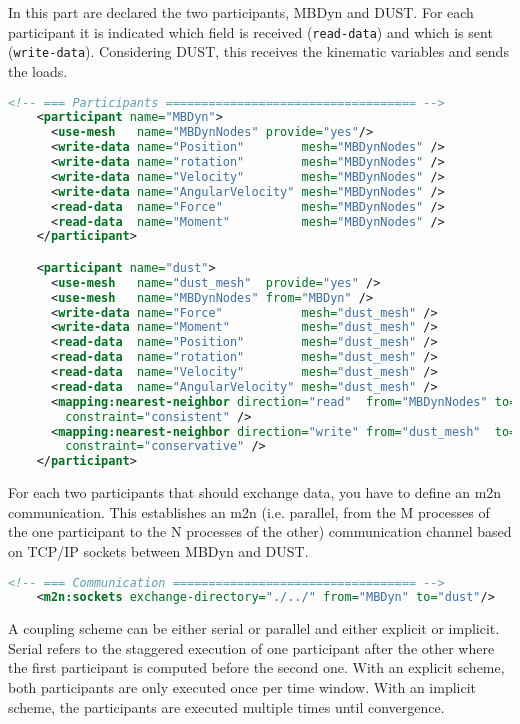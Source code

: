 In this part are declared the two participants, MBDyn and DUST. 
For each participant it is indicated which field is received 
(\texttt{read-data}) and which is sent (\texttt{write-data}). 
Considering DUST, this receives the kinematic variables and sends the loads. 
\begin{lstlisting}[language=XML]
    <!-- === Participants =================================== -->
    <participant name="MBDyn">
      <use-mesh   name="MBDynNodes" provide="yes"/>
      <write-data name="Position"        mesh="MBDynNodes" />
      <write-data name="rotation"        mesh="MBDynNodes" />
      <write-data name="Velocity"        mesh="MBDynNodes" />
      <write-data name="AngularVelocity" mesh="MBDynNodes" />
      <read-data  name="Force"           mesh="MBDynNodes" />
      <read-data  name="Moment"          mesh="MBDynNodes" />
    </participant>

    <participant name="dust">
      <use-mesh   name="dust_mesh"  provide="yes" />
      <use-mesh   name="MBDynNodes" from="MBDyn" />
      <write-data name="Force"           mesh="dust_mesh" />
      <write-data name="Moment"          mesh="dust_mesh" />
      <read-data  name="Position"        mesh="dust_mesh" />
      <read-data  name="rotation"        mesh="dust_mesh" />
      <read-data  name="Velocity"        mesh="dust_mesh" />
      <read-data  name="AngularVelocity" mesh="dust_mesh" />
      <mapping:nearest-neighbor direction="read"  from="MBDynNodes" to="dust_mesh"
        constraint="consistent" />
      <mapping:nearest-neighbor direction="write" from="dust_mesh"  to="MBDynNodes"
        constraint="conservative" />
    </participant>
\end{lstlisting}

For each two participants that should exchange data, you have to define 
an m2n communication. 
This establishes an m2n (i.e. parallel, from the M processes of the one 
participant to the N processes of the other) communication channel based 
on TCP/IP sockets between MBDyn and DUST.
\begin{lstlisting}[language=XML]
    <!-- === Communication ================================== -->
    <m2n:sockets exchange-directory="./../" from="MBDyn" to="dust"/>
\end{lstlisting}

A coupling scheme can be either serial or parallel and either explicit or 
implicit. Serial refers to the staggered execution of one participant after 
the other where the first participant is computed before the second one. 
With an explicit scheme, both participants are only executed once per time window. 
With an implicit scheme, the participants are executed multiple times until convergence.

